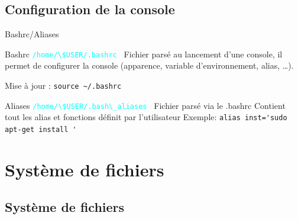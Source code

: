 \documentclass{beamer}
\begin{document}
\subsection{Configuration de la console}

\begin{frame}[fragile]{Bashrc/Aliases}
\begin{block}{Bashrc}
\textcolor{cyan}{\verb?/home/\$USER/.bashrc ?} \linebreak
Fichier parsé au lancement d'une console, il permet de configurer la console (apparence, variable d'environnement, alias, \dots ).

Mise à jour : \verb?source ~/.bashrc?
\end{block}
\begin{block}{Aliases}
\textcolor{cyan}{\verb?/home/\$USER/.bash\_aliases ?} \linebreak 
Fichier parsé via le .bashrc\linebreak
Contient tout les alias et fonctions définit par l'utilisateur
Exemple: \verb?alias inst='sudo apt-get install '?
\end{block}
\end{frame}


\section{Système de fichiers}
\subsection{Système de fichiers}
\end{document}
